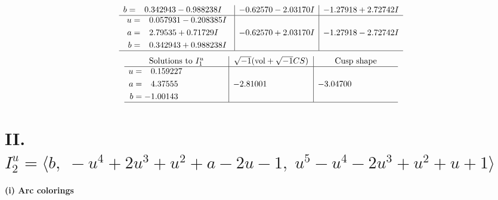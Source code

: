 \documentclass[1p]{elsarticle_modified}
\theoremstyle{definition}
\newcommand{\I}{\sqrt{-1}}
\begin{document}
$$\begin{array}{c|c|c}
\begin{aligned}
b &= \phantom{-}0.342943 - 0.988238 I\end{aligned}
 & -0.62570 - 2.03170 I & -1.27918 + 2.72742 I \\ \hline\begin{aligned}
u &= \phantom{-}0.057931 - 0.208385 I \\
a &= \phantom{-}2.79535 + 0.71729 I \\
b &= \phantom{-}0.342943 + 0.988238 I\end{aligned}
 & -0.62570 + 2.03170 I & -1.27918 - 2.72742 I\\
 \hline 
 \end{array}$$\newpage$$\begin{array}{c|c|c}  
\text{Solutions to }I^u_{1}& \I (\text{vol} + \sqrt{-1}CS) & \text{Cusp shape}\\
 \hline 
\begin{aligned}
u &= \phantom{-}0.159227\phantom{ +0.000000I} \\
a &= \phantom{-}4.37555\phantom{ +0.000000I} \\
b &= -1.00143\phantom{ +0.000000I}\end{aligned}
 & -2.81001\phantom{ +0.000000I} & -3.04700\phantom{ +0.000000I}\\
 \hline 
 \end{array}$$\newpage\newpage\renewcommand{\arraystretch}{1}
\centering \section*{II. $I^u_{2}= \langle b,\;- u^4+2 u^3+u^2+a-2 u-1,\;u^5- u^4-2 u^3+u^2+u+1 \rangle$}
\flushleft \textbf{(i) Arc colorings}\\
\end{document}

